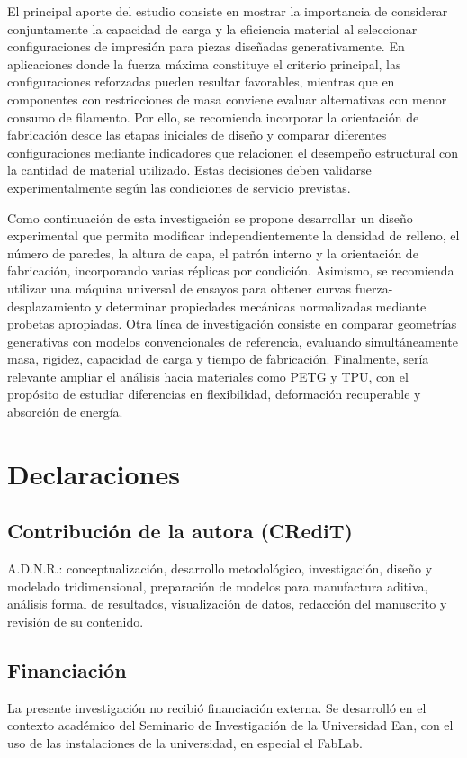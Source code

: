 \documentclass[10pt,twocolumn]{article}
\begin{document}
El principal aporte del estudio consiste en mostrar la importancia de considerar conjuntamente la capacidad de carga y la eficiencia material al seleccionar configuraciones de impresión para piezas diseñadas generativamente. En aplicaciones donde la fuerza máxima constituye el criterio principal, las configuraciones reforzadas pueden resultar favorables, mientras que en componentes con restricciones de masa conviene evaluar alternativas con menor consumo de filamento. Por ello, se recomienda incorporar la orientación de fabricación desde las etapas iniciales de diseño y comparar diferentes configuraciones mediante indicadores que relacionen el desempeño estructural con la cantidad de material utilizado. Estas decisiones deben validarse experimentalmente según las condiciones de servicio previstas.

Como continuación de esta investigación se propone desarrollar un diseño experimental que permita modificar independientemente la densidad de relleno, el número de paredes, la altura de capa, el patrón interno y la orientación de fabricación, incorporando varias réplicas por condición. Asimismo, se recomienda utilizar una máquina universal de ensayos para obtener curvas fuerza-desplazamiento y determinar propiedades mecánicas normalizadas mediante probetas apropiadas. Otra línea de investigación consiste en comparar geometrías generativas con modelos convencionales de referencia, evaluando simultáneamente masa, rigidez, capacidad de carga y tiempo de fabricación. Finalmente, sería relevante ampliar el análisis hacia materiales como PETG y TPU, con el propósito de estudiar diferencias en flexibilidad, deformación recuperable y absorción de energía.
\section{Declaraciones}
\subsection{Contribución de la autora (CRediT)}
A.D.N.R.: conceptualización, desarrollo metodológico, investigación, diseño y modelado tridimensional, preparación de modelos para manufactura aditiva, análisis formal de resultados, visualización de datos, redacción del manuscrito y revisión de su contenido.
\subsection{Financiación}
La presente investigación no recibió financiación externa. Se desarrolló en el contexto académico del Seminario de Investigación de la Universidad Ean, con el uso de las instalaciones de la universidad, en especial el FabLab.
\end{document}
